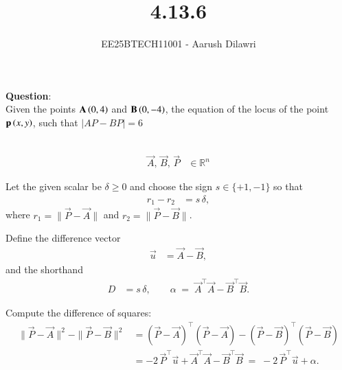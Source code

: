 \documentclass[journal]{IEEEtran}
\begin{document}

\vspace{3cm}

\title{4.13.6}
\author{EE25BTECH11001 - Aarush Dilawri}
\maketitle
{\let\newpage\relax\maketitle}

\renewcommand{\thefigure}{\theenumi}
\renewcommand{\thetable}{\theenumi}
\setlength{\intextsep}{10pt} %


\renewcommand{\thetable}{\theenumi}

\textbf{Question}:\\
Given the points $\mathbf{A} \left(0,4\right)$ and $\mathbf{B} \left(0,-4\right)$, the equation of the locus of the point $\mathbf{p}\left(x,y\right)$, such that $\lvert AP -BP \rvert = 6$

\solution \\
\begin{align}
    \vec{A},\,\vec{B},\,\vec{P} &\in \mathbb{R}^n
\end{align}

Let the given scalar be $ \delta \ge 0 $ and choose the sign $s\in\{+1,-1\}$ so that
\begin{align}
    r_1 - r_2 &= s\,\delta,
\end{align}
where $r_1=\|\vec{P}-\vec{A}\|$ and $r_2=\|\vec{P}-\vec{B}\|$.

Define the difference vector
\begin{align}
    \vec{u} &= \vec{A}-\vec{B},
\end{align}
and the shorthand
\begin{align}
    D &= s\,\delta, \qquad
    \alpha \;=\; \vec{A}^\top\vec{A} - \vec{B}^\top\vec{B}.
\end{align}

Compute the difference of squares:
\begin{align}
    \|\vec{P}-\vec{A}\|^2 - \|\vec{P}-\vec{B}\|^2
    &= (\vec{P}-\vec{A})^\top(\vec{P}-\vec{A}) - (\vec{P}-\vec{B})^\top(\vec{P}-\vec{B}) \\
    &= -2\,\vec{P}^\top\vec{u} + \vec{A}^\top\vec{A} - \vec{B}^\top\vec{B}
    \;=\; -2\,\vec{P}^\top\vec{u} + \alpha .
\end{align}
\end{document}
